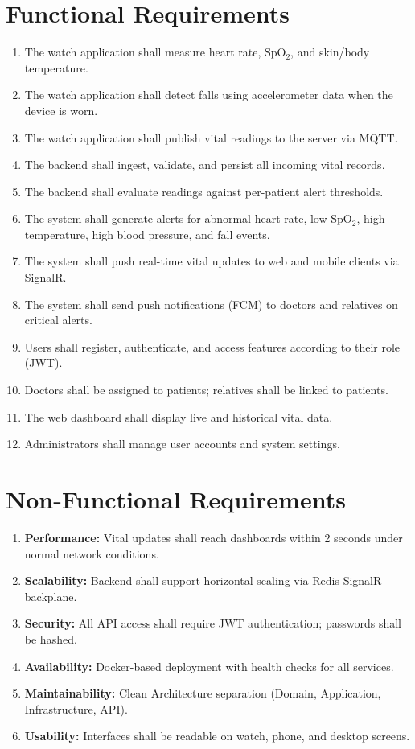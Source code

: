 \documentclass[12pt,a4paper]{report}
\begin{document}
\section{Functional Requirements}

\begin{enumerate}[label=FR\arabic*:, leftmargin=*]
  \item The watch application shall measure heart rate, SpO$_2$, and skin/body temperature.
  \item The watch application shall detect falls using accelerometer data when the device is worn.
  \item The watch application shall publish vital readings to the server via MQTT.
  \item The backend shall ingest, validate, and persist all incoming vital records.
  \item The backend shall evaluate readings against per-patient alert thresholds.
  \item The system shall generate alerts for abnormal heart rate, low SpO$_2$, high temperature, high blood pressure, and fall events.
  \item The system shall push real-time vital updates to web and mobile clients via SignalR.
  \item The system shall send push notifications (FCM) to doctors and relatives on critical alerts.
  \item Users shall register, authenticate, and access features according to their role (JWT).
  \item Doctors shall be assigned to patients; relatives shall be linked to patients.
  \item The web dashboard shall display live and historical vital data.
  \item Administrators shall manage user accounts and system settings.
\end{enumerate}

\section{Non-Functional Requirements}

\begin{enumerate}[label=NFR\arabic*:, leftmargin=*]
  \item \textbf{Performance:} Vital updates shall reach dashboards within 2 seconds under normal network conditions.
  \item \textbf{Scalability:} Backend shall support horizontal scaling via Redis SignalR backplane.
  \item \textbf{Security:} All API access shall require JWT authentication; passwords shall be hashed.
  \item \textbf{Availability:} Docker-based deployment with health checks for all services.
  \item \textbf{Maintainability:} Clean Architecture separation (Domain, Application, Infrastructure, API).
  \item \textbf{Usability:} Interfaces shall be readable on watch, phone, and desktop screens.
\end{enumerate}
\end{document}
